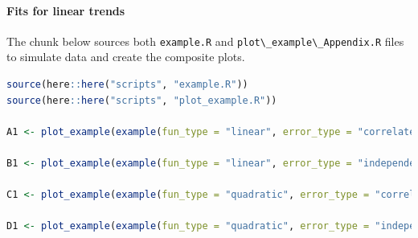 \documentclass[
]{article}
\newcommand{\passthrough}[1]{#1}
\begin{document}
\hypertarget{fits-for-linear-trends}{%
\paragraph{Fits for linear trends}\label{fits-for-linear-trends}}

The chunk below sources both \passthrough{\lstinline!example.R!} and \passthrough{\lstinline!plot\_example\_Appendix.R!} files to simulate data and create the composite plots.

\begin{lstlisting}[language=R]
source(here::here("scripts", "example.R"))
source(here::here("scripts", "plot_example.R"))

A1 <- plot_example(example(fun_type = "linear", error_type = "correlated"), option = "composite")

B1 <- plot_example(example(fun_type = "linear", error_type = "independent"), option = "composite")

C1 <- plot_example(example(fun_type = "quadratic", error_type = "correlated"), option = "composite")

D1 <- plot_example(example(fun_type = "quadratic", error_type = "independent"), option = "composite")
\end{lstlisting}
\end{document}
